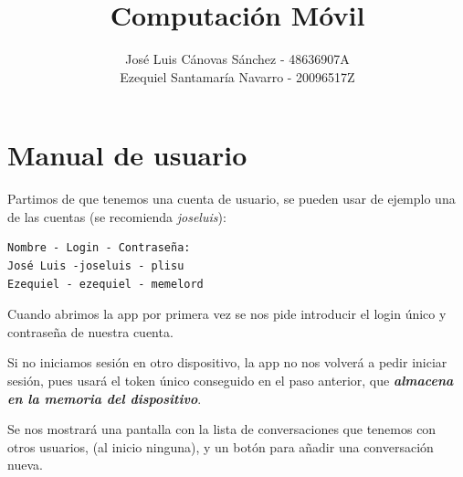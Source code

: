\documentclass[]{article}
\title{Computación Móvil}
\author{José Luis Cánovas Sánchez - 48636907A\\Ezequiel Santamaría Navarro - 20096517Z}
\begin{document}
\maketitle


\tableofcontents

\section{Manual de usuario}

Partimos de que tenemos una cuenta de usuario, se pueden usar de ejemplo una de las cuentas (se recomienda \textit{joseluis}):

\begin{verbatim}
Nombre - Login - Contraseña:
José Luis -joseluis - plisu
Ezequiel - ezequiel - memelord
\end{verbatim}

Cuando abrimos la app por primera vez se nos pide introducir el login único y contraseña de nuestra cuenta.

\hfill

Si no iniciamos sesión en otro dispositivo, la app no nos volverá a pedir iniciar sesión, pues usará el token único conseguido en el paso anterior, que \textit{\textbf{almacena en la memoria del dispositivo}}.

\hfill

Se nos mostrará una pantalla con la lista de conversaciones que tenemos con otros usuarios, (al inicio ninguna), y un botón para añadir una conversación nueva.
\end{document}
